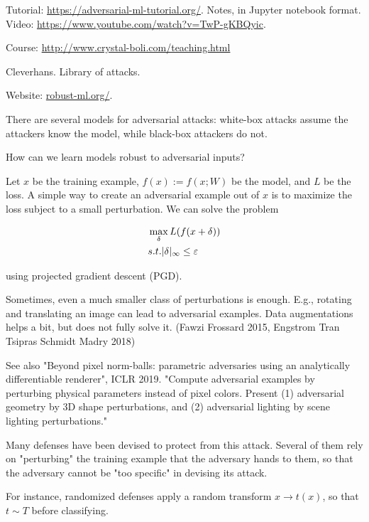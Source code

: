 \documentclass[english]{article}
\begin{document}
Tutorial: \url{https://adversarial-ml-tutorial.org/}. Notes, in Jupyter notebook format. Video: \url{https://www.youtube.com/watch?v=TwP-gKBQyic}.

Course: \url{http://www.crystal-boli.com/teaching.html}


Cleverhans. Library of attacks. 

Website: \url{robust-ml.org/}.


\item There are several models for adversarial attacks: white-box attacks assume the attackers know the model, while black-box attackers do not. 

\item How can we learn models robust to adversarial inputs?

\item Let $x$ be the training example, $f(x):=f(x;W)$ be the model, and  $L$ be the loss. A simple way to create an adversarial example out of $x$ is to maximize the loss subject to a small perturbation. We can solve the problem 

\begin{align*}
&\max_\delta L(f(x+\delta))\\
&s.t. |\delta|_\infty \le \varepsilon
\end{align*}

using projected gradient descent (PGD).

\item Sometimes, even a much smaller class of perturbations is enough. E.g., rotating and translating an image can lead to adversarial examples. Data augmentations helps a bit, but does not fully solve it. (Fawzi Frossard 2015, Engstrom Tran Tsipras Schmidt Madry 2018) 

See also "Beyond pixel norm-balls: parametric adversaries using an analytically differentiable renderer", ICLR 2019. "Compute adversarial examples by perturbing physical parameters instead of pixel colors. Present (1) adversarial geometry by 3D shape perturbations, and (2) adversarial lighting by scene lighting perturbations."

\item Many defenses have been devised to protect from this attack. Several of them rely on "perturbing" the training example that the adversary hands to them, so that the adversary cannot be "too specific" in devising its attack. 

For instance, randomized defenses apply a random transform $x\to t(x)$, so that $t\sim T$ before classifying.
\end{document}
